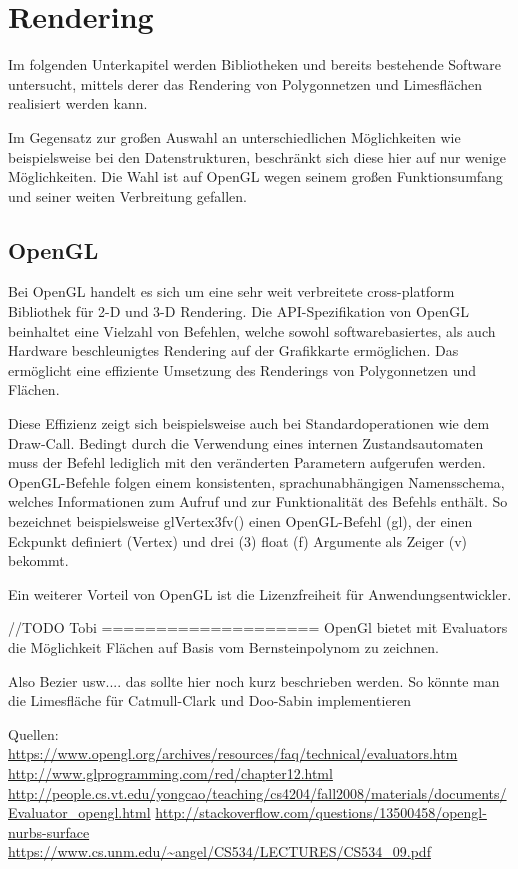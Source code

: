 \section{Rendering}

Im folgenden Unterkapitel werden Bibliotheken und bereits bestehende Software untersucht, mittels derer das Rendering von Polygonnetzen und Limesflächen realisiert werden kann.

Im Gegensatz zur großen Auswahl an unterschiedlichen Möglichkeiten wie beispielsweise bei den Datenstrukturen, beschränkt sich diese hier auf nur wenige Möglichkeiten. Die Wahl ist auf OpenGL wegen seinem großen Funktionsumfang und seiner weiten Verbreitung gefallen.


\subsection{OpenGL}

Bei OpenGL handelt es sich um eine sehr weit verbreitete cross-platform Bibliothek für 2-D und 3-D Rendering.
Die API-Spezifikation von OpenGL beinhaltet eine Vielzahl von Befehlen, welche sowohl softwarebasiertes, als auch Hardware beschleunigtes Rendering auf der Grafikkarte ermöglichen. Das ermöglicht eine effiziente Umsetzung des Renderings von Polygonnetzen und Flächen.

Diese Effizienz zeigt sich beispielsweise auch bei Standardoperationen wie dem Draw-Call. Bedingt durch die Verwendung eines internen Zustandsautomaten muss der Befehl lediglich mit den veränderten Parametern aufgerufen werden. OpenGL-Befehle folgen einem konsistenten, sprachunabhängigen Namensschema, welches Informationen zum Aufruf und zur Funktionalität des Befehls enthält. So bezeichnet beispielsweise glVertex3fv() einen OpenGL-Befehl (gl), der einen Eckpunkt definiert (Vertex) und drei (3) float (f) Argumente als Zeiger (v) bekommt.

Ein weiterer Vorteil von OpenGL ist die Lizenzfreiheit für Anwendungsentwickler.

//TODO Tobi ====================
OpenGl bietet mit Evaluators die Möglichkeit Flächen auf Basis vom Bernsteinpolynom zu zeichnen.

Also Bezier usw.... das sollte hier noch kurz beschrieben werden.
So könnte man die Limesfläche für Catmull-Clark und Doo-Sabin implementieren

Quellen:
\url{https://www.opengl.org/archives/resources/faq/technical/evaluators.htm}
\url{http://www.glprogramming.com/red/chapter12.html}
\url{http://people.cs.vt.edu/yongcao/teaching/cs4204/fall2008/materials/documents/Evaluator_opengl.html}
\url{http://stackoverflow.com/questions/13500458/opengl-nurbs-surface}
\url{https://www.cs.unm.edu/~angel/CS534/LECTURES/CS534_09.pdf}

